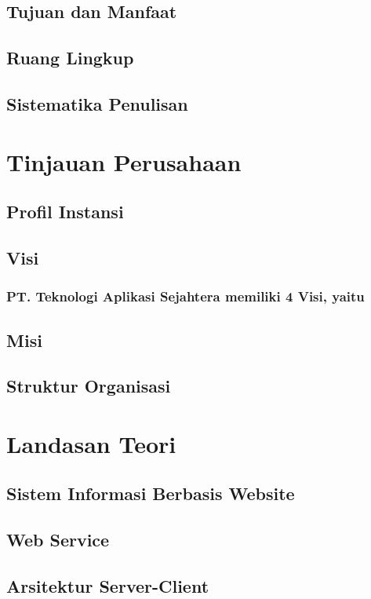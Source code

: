 \documentclass{article}
\begin{document}
\subsection{Tujuan dan Manfaat}
\subsection{Ruang Lingkup}
\subsection{Sistematika Penulisan}

\section{Tinjauan Perusahaan}
\subsection{Profil Instansi}
\subsection{Visi}
\subsubsection{PT. Teknologi Aplikasi Sejahtera memiliki 4 Visi, yaitu}
\subsection{Misi}
\subsection{Struktur Organisasi}

\section{Landasan Teori}
\subsection{Sistem Informasi Berbasis Website}
\subsection{Web Service}
\subsection{Arsitektur Server-Client}
\end{document}
